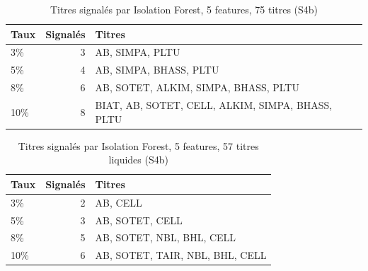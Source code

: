 \begin{table}[H]\centering\small
\caption{Titres signalés par Isolation Forest, 5 features, 75 titres (S4b)}\label{tab:annexe-if5f}
\begin{tabular}{lrp{9cm}}\toprule
Taux & Signalés & Titres \\ \midrule
3\% & 3 & AB, SIMPA, PLTU \\
5\% & 4 & AB, SIMPA, BHASS, PLTU \\
8\% & 6 & AB, SOTET, ALKIM, SIMPA, BHASS, PLTU \\
10\% & 8 & BIAT, AB, SOTET, CELL, ALKIM, SIMPA, BHASS, PLTU \\
\bottomrule\end{tabular}\end{table}
\begin{table}[H]\centering\small
\caption{Titres signalés par Isolation Forest, 5 features, 57 titres liquides (S4b)}\label{tab:annexe-if5f57}
\begin{tabular}{lrp{9cm}}\toprule
Taux & Signalés & Titres \\ \midrule
3\% & 2 & AB, CELL \\
5\% & 3 & AB, SOTET, CELL \\
8\% & 5 & AB, SOTET, NBL, BHL, CELL \\
10\% & 6 & AB, SOTET, TAIR, NBL, BHL, CELL \\
\bottomrule\end{tabular}\end{table}
